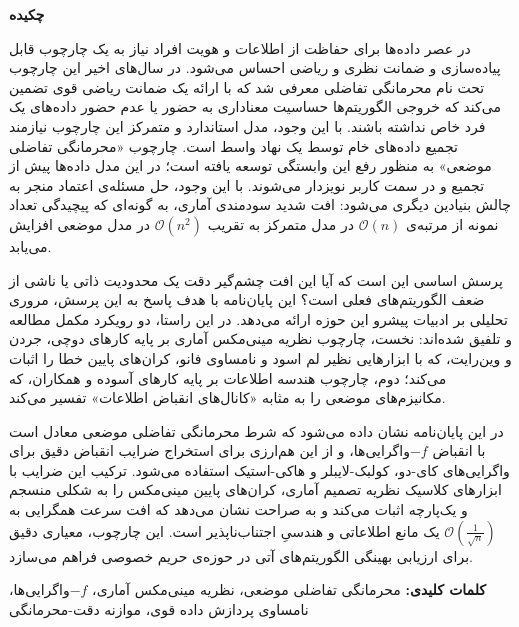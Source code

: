
\begin{center}
    \textbf{چکیده}
\end{center}

در عصر داده‌ها برای حفاظت از اطلاعات و هویت افراد نیاز به یک  چارچوب قابل پیاده‌سازی و ضمانت نظری و ریاضی احساس می‌شود. 
در سال‌های اخیر این چارچوب تحت نام محرمانگی تفاضلی معرفی شد که  با ارائه یک ضمانت ریاضی قوی تضمین می‌کند که خروجی الگوریتم‌ها حساسیت معناداری به حضور یا عدم حضور داده‌های یک فرد خاص نداشته باشند.
 با این وجود، مدل استاندارد و متمرکز این چارچوب نیازمند تجمیع داده‌های خام توسط یک نهاد واسط است. چارچوب «محرمانگی تفاضلی موضعی» به منظور رفع این وابستگی توسعه یافته است؛ در این مدل داده‌ها پیش از تجمیع و در سمت کاربر نویزدار می‌شوند. با این وجود، حل مسئله‌ی اعتماد منجر به چالش بنیادین دیگری می‌شود: افت شدید سودمندی آماری، به گونه‌ای که پیچیدگی تعداد نمونه از مرتبه‌ی $\mathcal{O}(n)$ در مدل متمرکز به تقریب $\mathcal{O}(n^2)$ در مدل موضعی افزایش می‌یابد.

پرسش اساسی این است که آیا این افت چشم‌گیر دقت یک محدودیت ذاتی یا ناشی از ضعف الگوریتم‌های فعلی است؟ این پایان‌نامه با هدف پاسخ به این پرسش، مروری تحلیلی بر ادبیات پیشرو این حوزه ارائه می‌دهد. در این راستا، دو رویکرد مکمل مطالعه و تلفیق شده‌اند: نخست، چارچوب نظریه مینی‌مکس آماری بر پایه کارهای دوچی، جردن و وین‌رایت، که با ابزارهایی نظیر لم اسود و نامساوی فانو، کران‌های پایین خطا را اثبات می‌کند؛ دوم، چارچوب هندسه اطلاعات بر پایه کارهای آسوده و همکاران، که مکانیزم‌های موضعی را به مثابه «کانال‌های انقباض اطلاعات» تفسیر می‌کند.

در این پایان‌نامه نشان داده می‌شود که شرط محرمانگی تفاضلی موضعی معادل است با انقباض $-f$واگرایی‌ها، و از این هم‌ارزی برای استخراج ضرایب انقباض دقیق برای واگرایی‌های کای-دو، کولبک-لایبلر و هاکی-استیک استفاده می‌شود. ترکیب این ضرایب با ابزارهای کلاسیک نظریه تصمیم آماری، کران‌های پایین مینی‌مکس را به شکلی منسجم و یک‌پارچه اثبات می‌کند و به صراحت نشان می‌دهد که افت سرعت همگرایی به $\mathcal{O}\!\left(\frac{1}{\sqrt{n}}\right)$ یک مانع اطلاعاتی و هندسیِ اجتناب‌ناپذیر است. این چارچوب، معیاری دقیق برای ارزیابی بهینگی الگوریتم‌های آتی در حوزه‌ی حریم خصوصی فراهم می‌سازد.

\vspace{2em}
\noindent\textbf{کلمات کلیدی:} محرمانگی تفاضلی موضعی، نظریه مینی‌مکس آماری، $-f$واگرایی‌ها، نامساوی پردازش داده قوی، موازنه دقت-محرمانگی

\newpage